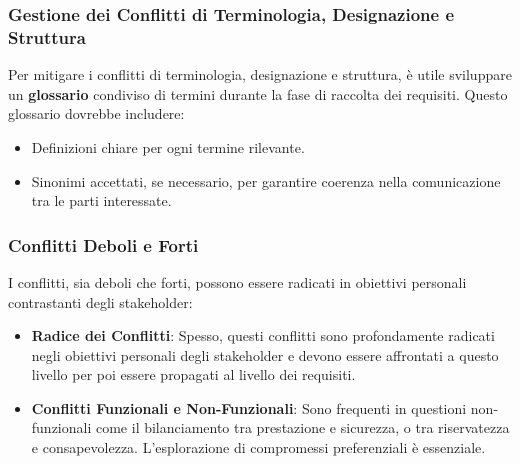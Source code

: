 \subsubsection{Gestione dei Conflitti di Terminologia, Designazione e Struttura}
Per mitigare i conflitti di terminologia, designazione e struttura, è utile sviluppare
un \textbf{glossario} condiviso di termini durante la fase di raccolta dei requisiti. Questo
glossario dovrebbe includere:
\begin{itemize}
    \item Definizioni chiare per ogni termine rilevante.
    \item Sinonimi accettati, se necessario, per garantire coerenza nella
    comunicazione tra le parti interessate.
\end{itemize}

\subsubsection{Conflitti Deboli e Forti}
I conflitti, sia deboli che forti, possono essere radicati in obiettivi personali
contrastanti degli stakeholder:
\begin{itemize}
    \item \textbf{Radice dei Conflitti}: Spesso, questi conflitti sono profondamente
    radicati negli obiettivi personali degli stakeholder e devono essere affrontati
    a questo livello per poi essere propagati al livello dei requisiti.
    \item \textbf{Conflitti Funzionali e Non-Funzionali}: Sono frequenti in questioni
    non-funzionali come il bilanciamento tra prestazione e sicurezza, o tra riservatezza
    e consapevolezza. L'esplorazione di compromessi preferenziali è essenziale.
\end{itemize}

